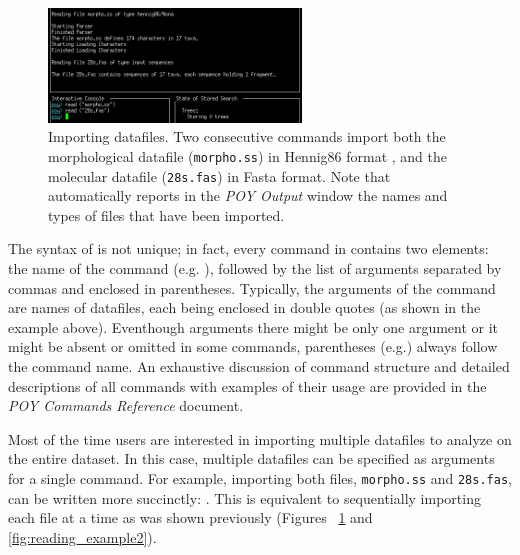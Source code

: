 \begin{figure}
    \begin{center}
        \includegraphics[width=0.6\textwidth]{figures/reading_example.jpg}
    \end{center}
    \caption{Importing datafiles. Two consecutive  commands import both the  morphological datafile (\texttt{morpho.ss}) in Hennig86 format , and the molecular datafile (\texttt{28s.fas}) in Fasta format. Note that \poy automatically reports  in the \emph{POY Output} window the names and types of files that have been imported.}
    \label{fig:readingexample}
\end{figure}

The syntax of  is not unique; in fact, every command in \poyv contains two elements: the name of the command (e.g. ), followed by the list of arguments 
separated by commas and enclosed in parentheses. Typically, the arguments of the command  are names of datafiles, each being enclosed in double quotes (as shown in the example above). Eventhough arguments there might be only one argument or it might be absent or omitted in some commands, parentheses (e.g.) always follow the command name. An exhaustive discussion of \poy command structure and detailed descriptions of all commands with examples of their usage are provided in the \emph{POY Commands Reference} document.

Most of the time users are interested in importing multiple datafiles to analyze on the entire dataset. In this case, multiple datafiles can be specified as arguments for a single command. For example, importing both files, \texttt{morpho.ss} and \texttt{28s.fas}, can be written more succinctly:
. This is equivalent to sequentially importing each file at a time as was shown previously (Figures ~\ref{fig:readingexample} and \ref{fig:reading_example2}).

